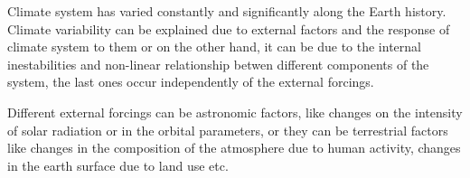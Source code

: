 
Climate system has varied constantly and significantly along the Earth history. Climate variability can be explained due to external factors and the response of climate system to them or on the other hand, it can be due to the internal inestabilities and non-linear relationship betwen different components of the system, the last ones occur independently of the external forcings.


Different external forcings can be astronomic factors, like changes on the intensity of solar radiation or in the orbital parameters, or they can be terrestrial factors like changes in the composition of the atmosphere due to human activity, changes in the earth surface due to land use etc.




